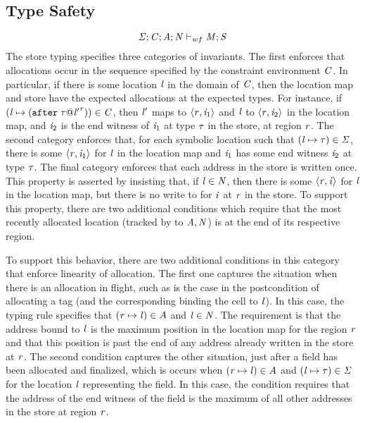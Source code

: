 \subsection{Type Safety}

%
\begin{displaymath}
  \mathit{\Sigma};\mathit{C};\mathit{A};\mathit{N} \vdash_{wf} \mathit{M};\mathit{S}
\end{displaymath}
%
The store typing specifies three categories of invariants.
%
The first enforces that allocations occur in the sequence
specified by the constraint environment $\mathit{C}$.
%
In particular, if there is some location $\mathit{l}$ in the domain of
$\mathit{C}$, then the location map and store have the expected
allocations at the expected types.
%
For instance, if $(\mathit{l} \mapsto
(\texttt{after}\; \mathit{\tau} @ {\mathit{l}'}^{\mathit{r}})) \in \mathit{C}$, then $\mathit{l}'$ maps
to $\langle \mathit{r}, \mathit{i}_1 \rangle ^{}$ and $\mathit{l}$ to
$\langle \mathit{r}, \mathit{i}_2 \rangle ^{}$ in the location map, and $\mathit{i}_2$ is
the end witness of $\mathit{i}_1$ at type $\mathit{\tau}$ in the store, at region
$\mathit{r}$.
%
The second category enforces that, for each symbolic location such
that $(\mathit{l} \mapsto \mathit{\tau}) \in \mathit{\Sigma}$, there is some
$\langle \mathit{r}, \mathit{i}_1 \rangle ^{}$ for $\mathit{l}$ in the location map and
$\mathit{i}_1$ has some end witness $\mathit{i}_2$ at type $\mathit{\tau}$.
%
The final category enforces that each address in the store is written
once.
%
This property is asserted by insisting that, if $\mathit{l} \in \mathit{N}$, then
there is some $\langle \mathit{r}, \mathit{i} \rangle ^{}$ for $\mathit{l}$ in the location
map, but there is no write to for $\mathit{i}$ at $\mathit{r}$ in the store.
%
To support this property, there are two additional conditions which
require that the most recently allocated location (tracked by
to $\mathit{A}, \mathit{N}$) is at the end of its respective region.

To support this behavior, there are two additional conditions in this
category that enforce linearity of allocation.
%
The first one captures the situation when there is an allocation in
flight, such as is the case in the postcondition of allocating
a tag (and the corresponding binding the cell to $\mathit{l}$).
%
In this case, the typing rule specifies that $(\mathit{r} \mapsto \mathit{l}) \in
A$ and $\mathit{l} \in \mathit{N}$.
%
The requirement is that the address bound to $\mathit{l}$ is the maximum
position in the location map for the region $\mathit{r}$ and that this
position is past the end of any address already written in the store
at $\mathit{r}$.
The second condition captures the other situation, just after
a field has been allocated and finalized, which is occurs
when $(\mathit{r} \mapsto \mathit{l}) \in A$ and $(\mathit{l} \mapsto \mathit{\tau}) \in \mathit{\Sigma}$
for the location $\mathit{l}$ representing the field.
%
In this case, the condition requires that the address of the end
witness of the field is the maximum of all other addresses in the
store at region $\mathit{r}$.

